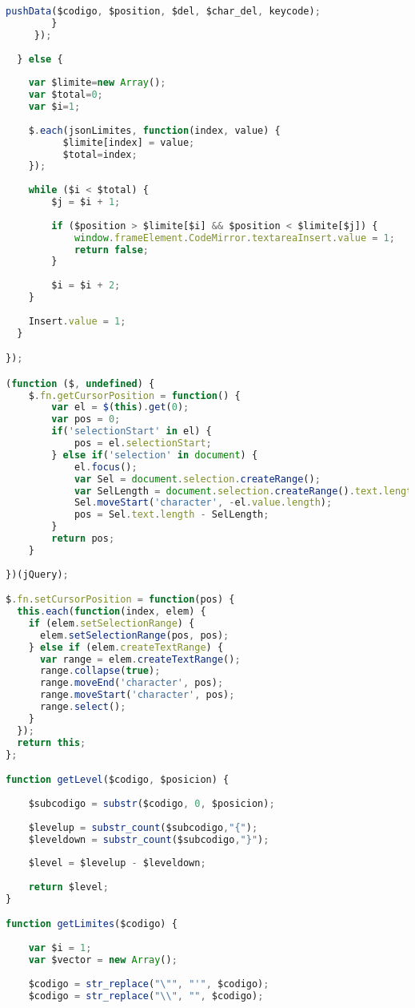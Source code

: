 \begin{lstlisting}[language=Javascript]
	   	   pushData($codigo, $position, $del, $char_del, keycode);
	    }
     });
  
  } else {
  	
	var $limite=new Array();
    var $total=0;
    var $i=1;
  	   
  	$.each(jsonLimites, function(index, value) { 
          $limite[index] = value;
  	      $total=index;
    });
	   
	while ($i < $total) {
		$j = $i + 1;
	   	 
        if ($position > $limite[$i] && $position < $limite[$j]) {
	   		window.frameElement.CodeMirror.textareaInsert.value = 1;
	   		return false;
	   	}
	   	 
	   	$i = $i + 2;
	}
  	
  	Insert.value = 1;
  }

});

(function ($, undefined) {
    $.fn.getCursorPosition = function() {
        var el = $(this).get(0);
        var pos = 0;
        if('selectionStart' in el) {
            pos = el.selectionStart;
        } else if('selection' in document) {
            el.focus();
            var Sel = document.selection.createRange();
            var SelLength = document.selection.createRange().text.length;
            Sel.moveStart('character', -el.value.length);
            pos = Sel.text.length - SelLength;
        }
        return pos;
    }
    
})(jQuery);

$.fn.setCursorPosition = function(pos) {
  this.each(function(index, elem) {
    if (elem.setSelectionRange) {
      elem.setSelectionRange(pos, pos);
    } else if (elem.createTextRange) {
      var range = elem.createTextRange();
      range.collapse(true);
      range.moveEnd('character', pos);
      range.moveStart('character', pos);
      range.select();
    }
  });
  return this;
};

function getLevel($codigo, $posicion) {
		
	$subcodigo = substr($codigo, 0, $posicion);
	
	$levelup = substr_count($subcodigo,"{");
	$leveldown = substr_count($subcodigo,"}");
	
	$level = $levelup - $leveldown;
	
	return $level;
}

function getLimites($codigo) {
	
	var $i = 1;
	var $vector = new Array();
 
	$codigo = str_replace("\"", "'", $codigo);
	$codigo = str_replace("\\", "", $codigo);
   

\end{lstlisting}
